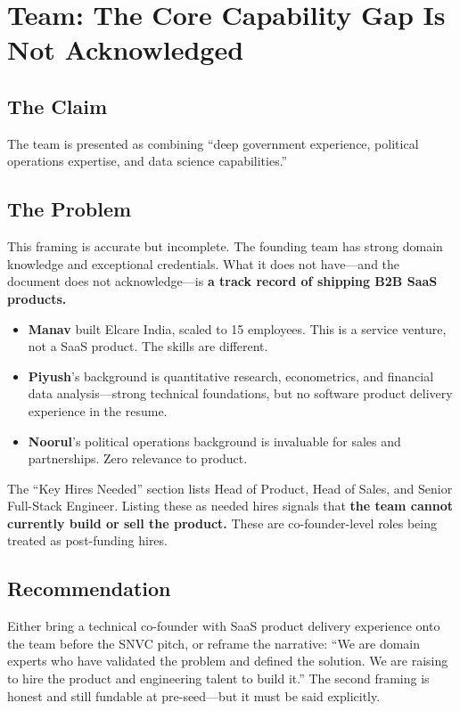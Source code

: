 \documentclass[12pt, a4paper]{article}
\begin{document}
\newpage

\section{Team: The Core Capability Gap Is Not Acknowledged}

\subsection{The Claim}
The team is presented as combining ``deep government experience, political operations expertise, and data science capabilities.''

\subsection{The Problem}

This framing is accurate but incomplete. The founding team has strong domain knowledge and exceptional credentials. What it does not have---and the document does not acknowledge---is \textbf{a track record of shipping B2B SaaS products.}

\begin{itemize}[leftmargin=1.5em]
    \item \textbf{Manav} built Elcare India, scaled to 15 employees. This is a service venture, not a SaaS product. The skills are different.
    \item \textbf{Piyush}'s background is quantitative research, econometrics, and financial data analysis---strong technical foundations, but no software product delivery experience in the resume.
    \item \textbf{Noorul}'s political operations background is invaluable for sales and partnerships. Zero relevance to product.
\end{itemize}

The ``Key Hires Needed'' section lists Head of Product, Head of Sales, and Senior Full-Stack Engineer. Listing these as needed hires signals that \textbf{the team cannot currently build or sell the product.} These are co-founder-level roles being treated as post-funding hires.

\subsection{Recommendation}
Either bring a technical co-founder with SaaS product delivery experience onto the team before the SNVC pitch, or reframe the narrative: ``We are domain experts who have validated the problem and defined the solution. We are raising to hire the product and engineering talent to build it.'' The second framing is honest and still fundable at pre-seed---but it must be said explicitly.
\end{document}

